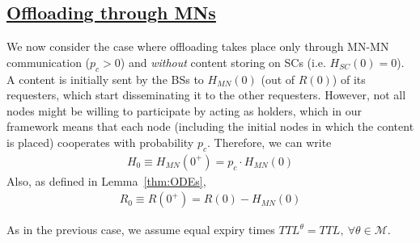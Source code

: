 \documentclass[10pt,conference,letterpaper]{IEEEtran}
\begin{document}
\subsection*{\underline{Offloading through MNs}} 
We now consider the case where offloading takes place only through MN-MN communication ($p_{c}>0$) and \textit{without} content storing on SCs (i.e. $H_{SC}(0)=0$). A content is initially sent by the BSs to $H_{MN}(0)$ (out of $R(0)$) of its requesters, which start disseminating it to the other requesters. However, not all nodes might be willing to participate by acting as holders, which in our framework means that each node (including the initial nodes in which the content is placed) cooperates with probability $p_{c}$. Therefore, we can write 
\begin{align*}
 H_{0}\equiv H_{MN}(0^{+})= p_{c}\cdot H_{MN}(0)
\end{align*}
Also, as defined in Lemma~\ref{thm:ODEs},
\begin{align*}
 R_{0}\equiv R(0^{+}) = R(0)-H_{MN}(0)
\end{align*}

As in the previous case, we assume equal expiry times $TTL^{\theta}=TTL, ~\forall\theta\in\mathcal{M}$.
\end{document}
